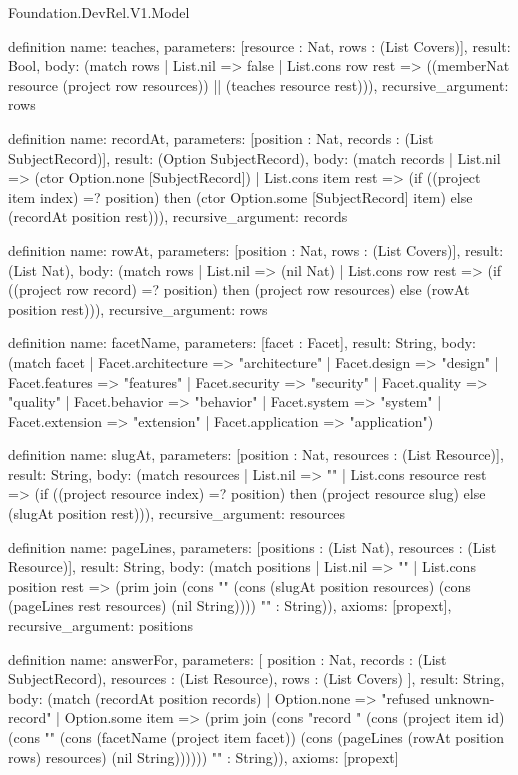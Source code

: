\begin{lexlean}{Foundation.DevRel.V1.Model}
\begin{semanticmodule}
definition{
  name: teaches,
  parameters: [resource : Nat, rows : (List Covers)],
  result: Bool,
  body: (match rows
    | List.nil => false
    | List.cons row rest => ((memberNat resource (project row resources)) || (teaches resource rest))),
  recursive_argument: rows
}

definition{
  name: recordAt,
  parameters: [position : Nat, records : (List SubjectRecord)],
  result: (Option SubjectRecord),
  body: (match records
    | List.nil => (ctor Option.none [SubjectRecord])
    | List.cons item rest => (if ((project item index) =? position) then (ctor Option.some [SubjectRecord] item) else (recordAt position rest))),
  recursive_argument: records
}

definition{
  name: rowAt,
  parameters: [position : Nat, rows : (List Covers)],
  result: (List Nat),
  body: (match rows
    | List.nil => (nil Nat)
    | List.cons row rest => (if ((project row record) =? position) then (project row resources) else (rowAt position rest))),
  recursive_argument: rows
}

definition{
  name: facetName,
  parameters: [facet : Facet],
  result: String,
  body: (match facet
    | Facet.architecture => "architecture"
    | Facet.design => "design"
    | Facet.features => "features"
    | Facet.security => "security"
    | Facet.quality => "quality"
    | Facet.behavior => "behavior"
    | Facet.system => "system"
    | Facet.extension => "extension"
    | Facet.application => "application")
}

definition{
  name: slugAt,
  parameters: [position : Nat, resources : (List Resource)],
  result: String,
  body: (match resources
    | List.nil => ""
    | List.cons resource rest => (if ((project resource index) =? position) then (project resource slug) else (slugAt position rest))),
  recursive_argument: resources
}

definition{
  name: pageLines,
  parameters: [positions : (List Nat), resources : (List Resource)],
  result: String,
  body: (match positions
    | List.nil => ""
    | List.cons position rest => (prim join (cons "\npage " (cons (slugAt position resources) (cons (pageLines rest resources) (nil String)))) "" : String)),
  axioms: [propext],
  recursive_argument: positions
}

definition{
  name: answerFor,
  parameters: [
    position : Nat,
    records : (List SubjectRecord),
    resources : (List Resource),
    rows : (List Covers)
  ],
  result: String,
  body: (match (recordAt position records)
    | Option.none => "refused unknown-record"
    | Option.some item => (prim join (cons "record " (cons (project item id) (cons "\nfacet " (cons (facetName (project item facet)) (cons (pageLines (rowAt position rows) resources) (nil String)))))) "" : String)),
  axioms: [propext]
}


\end{semanticmodule}
\end{lexlean}
